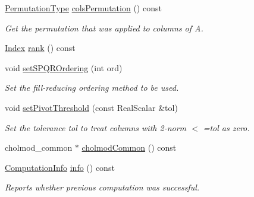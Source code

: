 \begin{DoxyCompactItemize}
\mbox{\label{class_eigen_1_1_s_p_q_r_ab1b7f54ba1cd8d77506ae676fea4fec0}} 
\hyperlink{group___core___module_class_eigen_1_1_map}{Permutation\+Type} \hyperlink{class_eigen_1_1_s_p_q_r_ab1b7f54ba1cd8d77506ae676fea4fec0}{cols\+Permutation} () const
\begin{DoxyCompactList}\small\item\em Get the permutation that was applied to columns of A. \end{DoxyCompactList}\item 
\hyperlink{namespace_eigen_a62e77e0933482dafde8fe197d9a2cfde}{Index} \hyperlink{class_eigen_1_1_s_p_q_r_a539b394ddb4894089e6634c744ea2ddc}{rank} () const
\item 
\mbox{\label{class_eigen_1_1_s_p_q_r_afa0db7888d808b453c23f62d62a4ad22}} 
void \hyperlink{class_eigen_1_1_s_p_q_r_afa0db7888d808b453c23f62d62a4ad22}{set\+S\+P\+Q\+R\+Ordering} (int ord)
\begin{DoxyCompactList}\small\item\em Set the fill-\/reducing ordering method to be used. \end{DoxyCompactList}\item 
\mbox{\label{class_eigen_1_1_s_p_q_r_ab7b42b75f621b0d4b5b0e090e23e2ce6}} 
void \hyperlink{class_eigen_1_1_s_p_q_r_ab7b42b75f621b0d4b5b0e090e23e2ce6}{set\+Pivot\+Threshold} (const Real\+Scalar \&tol)
\begin{DoxyCompactList}\small\item\em Set the tolerance tol to treat columns with 2-\/norm $<$ =tol as zero. \end{DoxyCompactList}\item 
cholmod\+\_\+common $\ast$ \hyperlink{class_eigen_1_1_s_p_q_r_a8c7d48d51a1fb08a3e27b8499e5c7f49}{cholmod\+Common} () const
\item 
\hyperlink{group__enums_ga85fad7b87587764e5cf6b513a9e0ee5e}{Computation\+Info} \hyperlink{class_eigen_1_1_s_p_q_r_a3ab7bacba8d2be20adc10b4d5b6c071f}{info} () const
\begin{DoxyCompactList}\small\item\em Reports whether previous computation was successful. \end{DoxyCompactList}\item 
\mbox{\label{class_eigen_1_1_s_p_q_r_a444d838c0175e3879cf8236e59a3763e}} 

\end{DoxyCompactItemize}
